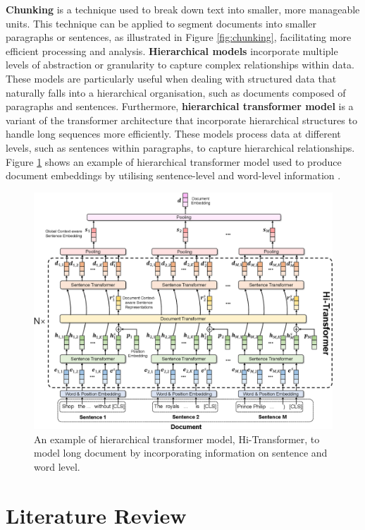 \textbf{Chunking} is a technique used to break down text into smaller, more manageable units. This technique can be applied to segment documents into smaller paragraphs or sentences, as illustrated in Figure \ref{fig:chunking}, facilitating more efficient processing and analysis. \textbf{Hierarchical models} \cite{sun-2020-fine-tune} incorporate multiple levels of abstraction or granularity to capture complex relationships within data. These models are particularly useful when dealing with structured data that naturally falls into a hierarchical organisation, such as documents composed of paragraphs and sentences. Furthermore, \textbf{hierarchical transformer model} is a variant of the transformer architecture that incorporate hierarchical structures to handle long sequences more efficiently. These models process data at different levels, such as sentences within paragraphs, to capture hierarchical relationships. Figure \ref{fig:hi_transformer} shows an example of hierarchical transformer model used to produce document embeddings by utilising sentence-level and word-level information \cite{wu-2021-hi-transformer}.

\begin{figure}[htbp]
    \centering
    \includegraphics[width=0.9\linewidth]{images/hi_transformer.png}
    \caption{An example of hierarchical transformer model, Hi-Transformer\cite{wu-2021-hi-transformer}, to model long document by incorporating information on sentence and word level.}
    \label{fig:hi_transformer}
\end{figure}

\section{Literature Review}

